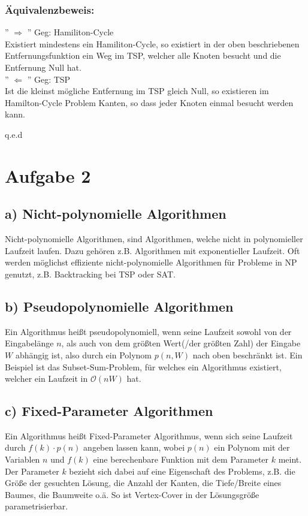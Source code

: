 \documentclass[a4paper,11pt,twoside]{article}
\begin{document}
 \subsubsection*{Äquivalenzbeweis:} 
'' $\Rightarrow$ ''
Geg: Hamiliton-Cycle\\
Existiert mindestens ein Hamiliton-Cycle, so existiert in der oben beschriebenen Entfernungsfunktion ein Weg im TSP, welcher alle Knoten besucht und die Entfernung Null hat. \\

'' $\Leftarrow$ ''
Geg: TSP\\
Ist die kleinst mögliche Entfernung im TSP gleich Null, so existieren im Hamilton-Cycle Problem Kanten, so dass jeder Knoten einmal besucht werden kann. \\

\begin{flushright}
	q.e.d
\end{flushright}


\section*{Aufgabe 2}
\subsection*{a) Nicht-polynomielle Algorithmen}
Nicht-polynomielle Algorithmen, sind Algorithmen, welche nicht in polynomieller Laufzeit laufen. Dazu gehören z.B. Algorithmen mit exponentieller Laufzeit. Oft werden möglichst effiziente nicht-polynomielle Algorithmen für Probleme in NP genutzt, z.B. Backtracking bei TSP oder SAT.
\subsection*{b) Pseudopolynomielle Algorithmen}
Ein Algorithmus heißt pseudopolynomiell, wenn seine Laufzeit sowohl von der Eingabelänge $n$, als auch von dem größten Wert(/der größten Zahl) der Eingabe $W$ abhängig ist, also durch ein Polynom $p(n,W)$ nach oben beschränkt ist. Ein Beispiel ist das Subset-Sum-Problem, für welches ein Algorithmus existiert, welcher ein Laufzeit in $\mathcal{O}(nW)$ hat.
\subsection*{c) Fixed-Parameter Algorithmen}
Ein Algorithmus heißt Fixed-Parameter Algorithmus, wenn sich seine Laufzeit durch $f(k)\cdot p(n)$ angeben lassen kann, wobei $p(n)$ ein Polynom mit der Variablen $n$ und $f(k)$ eine berechenbare Funktion mit dem Parameter $k$ meint. Der Parameter $k$ bezieht sich dabei auf eine Eigenschaft des Problems, z.B. die Größe der gesuchten Lösung, die Anzahl der Kanten, die Tiefe/Breite eines Baumes, die Baumweite o.ä. So ist Vertex-Cover in der Lösungsgröße parametrisierbar.
\end{document}
